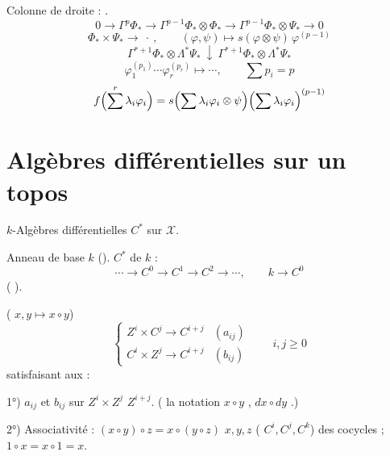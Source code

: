 \documentclass[11pt,a4paper]{article}
\begin{document}
Colonne de droite : .
\[
0 \longrightarrow \Gamma^p \Phi_* \longrightarrow \Gamma^{p-1}\Phi_* \otimes \Phi_* \longrightarrow \Gamma^{p-1}\Phi_* \otimes \Psi_* \longrightarrow 0
\]
\[
\Phi_* \times \Psi_* \longrightarrow \ \cdot\ , \qquad (\varphi , \psi) \longmapsto s(\varphi \otimes \psi)\, \varphi^{(p-1)}
\]
\[
\Gamma^{*+1}\Phi_* \otimes \Lambda^* \Psi_* \ \downarrow \ \Gamma^{*+1}\Phi_* \otimes \Lambda^{*}\Psi_*
\]
\[
\varphi_1^{(p_1)} \cdots \varphi_r^{(p_r)} \longmapsto \cdots , \qquad \sum p_i = p
\]
\[
f\Bigl( \sum^r \lambda_i \varphi_i \Bigr) = s\Bigl( \sum \lambda_i \varphi_i \otimes \psi \Bigr) \Bigl( \sum \lambda_i \varphi_i \Bigr)^{(p-1)}
\]

\section{Algèbres différentielles sur un topos}


$k$-Algèbres différentielles $C^*$ sur  $\mathcal{X}$.

Anneau de base $k$ (\ill{}).
 $C^*$ de $k$ :
\[
\cdots \longrightarrow C^0 \longrightarrow C^1 \longrightarrow C^2 \longrightarrow \cdots ,
\qquad k \longrightarrow C^0
\]
(\ill{} ).

 ( $x, y \mapsto x \circ y$)
\[
\begin{cases}
Z^i \times C^j \longrightarrow C^{i+j} & (a_{ij}) \\
C^i \times Z^j \longrightarrow C^{i+j} & (b_{ij})
\end{cases}
\qquad i, j \ge 0
\]
satisfaisant aux  :

1°) $a_{ij}$ et $b_{ij}$  sur $Z^i \times Z^j$ \ill{}  $Z^{i+j}$. (\ill{} la notation $x \circ y$ , \ill{} $dx \circ dy$ \ill{}.)

2°) Associativité : $(x \circ y) \circ z = x \circ (y \circ z)$ \ill{}  $x, y, z$ (\ill{} $C^i, C^j, C^k$) \ill{} des cocycles ; $1 \circ x = x \circ 1 = x$.
\end{document}
